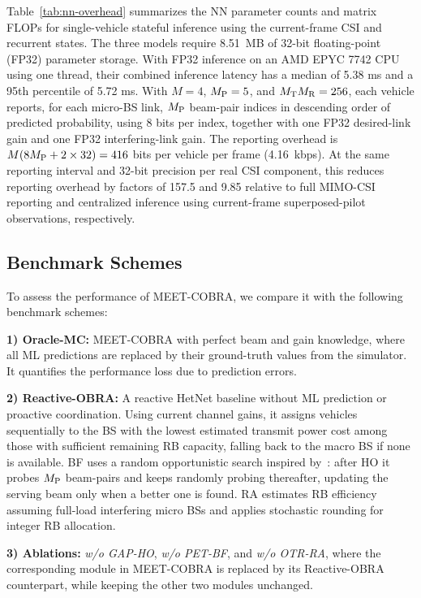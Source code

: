 \documentclass[10pt,journal,letterpaper]{IEEEtran}
\newcommand{\rev}[1]{\textcolor{revisioncolor}{{}#1}}
\newcommand{\omitted}[1]{}
\theoremstyle{remark}
\begin{document}
\rev{Table~\ref{tab:nn-overhead} summarizes the NN parameter counts and matrix FLOPs for single-vehicle stateful inference using the current-frame CSI and recurrent states. The three models require 8.51~MB of 32-bit floating-point (FP32) parameter storage. With FP32 inference on an AMD EPYC 
7742 CPU using one thread, their combined inference latency has a median of \rev{5.38} ms and a 95th percentile of \rev{5.72} ms. With $M=4$, $M_{\rm P}=5$, and $M_{\rm T}M_{\rm R}=256$, each vehicle reports, for each micro-BS link, $M_{\rm P}$ beam-pair indices in descending order of predicted probability, using 8 bits per index, together with one FP32 desired-link gain and one FP32 interfering-link gain. The \rev{reporting overhead} is $M(8M_{\rm P}+2\times32)=416$ bits per vehicle per frame (4.16~kbps). At the same reporting interval and 32-bit precision per real CSI component, this reduces \rev{reporting overhead} by factors of 157.5 and 9.85 relative to full MIMO-CSI reporting and centralized inference using current-frame superposed-pilot observations, respectively.}



\subsection{Benchmark Schemes}
\label{subsec:benchmarks}

To assess the performance of MEET-COBRA, we compare it with the following benchmark schemes:


\textbf{1) Oracle-MC:} MEET-COBRA with perfect beam and gain knowledge, where all ML predictions are replaced by their ground-truth values from the simulator. It quantifies the performance loss due to prediction errors.

\omitted{}

\textbf{\omitted{}\rev{2}) Reactive-OBRA:} A reactive HetNet baseline without ML prediction or proactive coordination. \omitted{}\rev{Using current channel gains, it assigns vehicles sequentially to the BS with the lowest estimated transmit power cost among those with sufficient remaining RB capacity, falling back to the macro BS if none is available.} BF uses a random opportunistic search inspired by~\cite{Aykin2020}: after HO it probes $M_{\rm P}$ beam-pairs and keeps randomly probing thereafter, updating the serving beam only when a better one is found. RA estimates RB efficiency assuming full-load interfering micro BSs and applies stochastic rounding for integer RB allocation.


\textbf{\omitted{}\rev{3}) Ablations:} \emph{w/o GAP-HO}, \emph{w/o PET-BF}, and \emph{w/o OTR-RA}, where the corresponding module in MEET-COBRA is replaced by its Reactive-OBRA counterpart, while keeping the other two modules unchanged.
\end{document}
